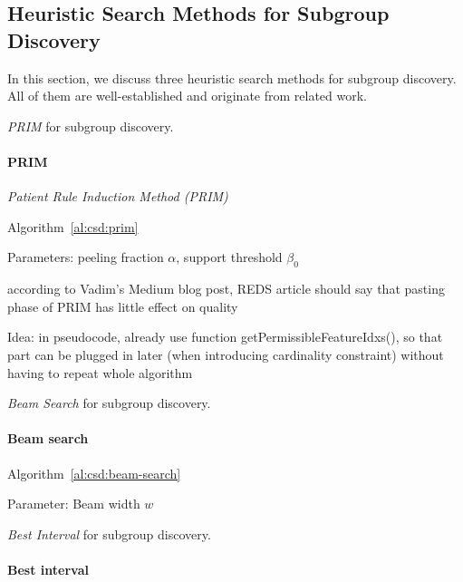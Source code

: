 \documentclass{article}
\theoremstyle{definition}
\begin{document}
\subsection{Heuristic Search Methods for Subgroup Discovery}
\label{sec:csd:fundamentals:heuristics}

In this section, we discuss three heuristic search methods for subgroup discovery.
All of them are well-established and originate from related work.

\begin{algorithm}[t]
	\DontPrintSemicolon
	\caption{\emph{PRIM} for subgroup discovery.}
	\label{al:csd:prim}
\end{algorithm}

\paragraph{PRIM}

\emph{Patient Rule Induction Method (PRIM)}~\cite{friedman1999bump}

Algorithm~\ref{al:csd:prim}

Parameters: peeling fraction $\alpha$, support threshold $\beta_0$

according to Vadim's Medium blog post, REDS article should say that pasting phase of PRIM has little effect on quality

Idea: in pseudocode, already use function getPermissibleFeatureIdxs(), so that part can be plugged in later (when introducing cardinality constraint) without having to repeat whole algorithm

\begin{algorithm}[t]
	\DontPrintSemicolon
	\caption{\emph{Beam Search} for subgroup discovery.}
	\label{al:csd:beam-search}
\end{algorithm}

\paragraph{Beam search}

Algorithm~\ref{al:csd:beam-search}

Parameter: Beam width $w$

\begin{algorithm}[t]
	\DontPrintSemicolon
	\caption{\emph{Best Interval} for subgroup discovery.}
	\label{al:csd:best-interval}
\end{algorithm}

\paragraph{Best interval}
\end{document}
